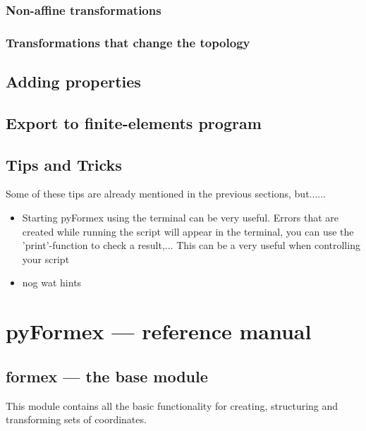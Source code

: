 \documentclass[a4paper]{manual}
\begin{document}
{\subsection{Non-affine transformations}

\subsection{Transformations that change the topology}


\section{Adding properties}

\section{Export to finite-elements program}

\section{Tips and Tricks}

Some of these tips are already mentioned in the previous sections, but......
\begin{itemize}
\item Starting pyFormex using the terminal can be very useful. Errors that are created while running the script will appear in the terminal, you can use the 'print'-function to check a result,... This can be a very useful when controlling your script
\item nog wat hints 
\end{itemize}





\chapter{pyFormex --- reference manual}
{\label{cha:reference}

\section{formex --- the base module}
{\label{sec:formex}

This module contains all the basic functionality for creating, structuring and transforming sets of coordinates.

}}}
\end{document}

